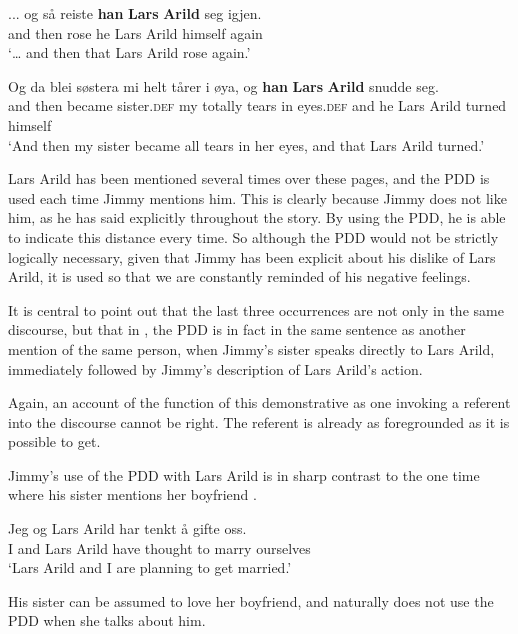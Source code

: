\documentclass[output=paper,colorlinks,citecolor=brown]{langscibook}
\begin{document}
\ea\label{ex:johannessen:26}
 \gll ... og så reiste \textbf{han} \textbf{Lars} \textbf{Arild} seg igjen.\\
    {} and then rose he Lars Arild himself again\\
\glt ‘… and then that Lars Arild rose again.’ \citep[68, middle]{Rishoi2014}
\z

\ea\label{ex:johannessen:27}
 \gll Og da blei søstera mi helt tårer i øya, og \textbf{han} \textbf{Lars} \textbf{Arild} snudde seg.\\
     and then became sister.\textsc{def} my totally tears in eyes.\textsc{def} and he Lars Arild turned himself\\
\glt ‘And then my sister became all tears in her eyes, and that Lars Arild turned.’ \citep[69, top]{Rishoi2014}
\z

Lars Arild has been mentioned several times over these pages, and the PDD is used each time Jimmy mentions him. This is clearly because Jimmy does not like him, as he has said explicitly throughout the story. By using the PDD, he is able to indicate this distance every time. So although the PDD would not be strictly logically necessary, given that Jimmy has been explicit about his dislike of Lars Arild, it is used so that we are constantly reminded of his negative feelings. 

It is central to point out that the last three occurrences are not only in the same discourse, but that in , the PDD is in fact in the same sentence as another mention of the same person, when Jimmy’s sister speaks directly to Lars Arild, immediately followed by Jimmy’s description of Lars Arild’s action. 

Again, an account of the function of this demonstrative as one invoking a referent into the discourse cannot be right. The referent is already as foregrounded as it is possible to get. 

Jimmy’s use of the PDD with Lars Arild is in sharp contrast to the one time where his sister mentions her boyfriend .

\ea\label{ex:johannessen:28}
 \gll Jeg og Lars Arild har tenkt å gifte oss.\\
     I and Lars Arild have thought to marry ourselves\\
\glt ‘Lars Arild and I are planning to get married.’ \citep[68, middle]{Rishoi2014}
\z

His sister can be assumed to love her boyfriend, and naturally does not use the PDD when she talks about him.
\end{document}
